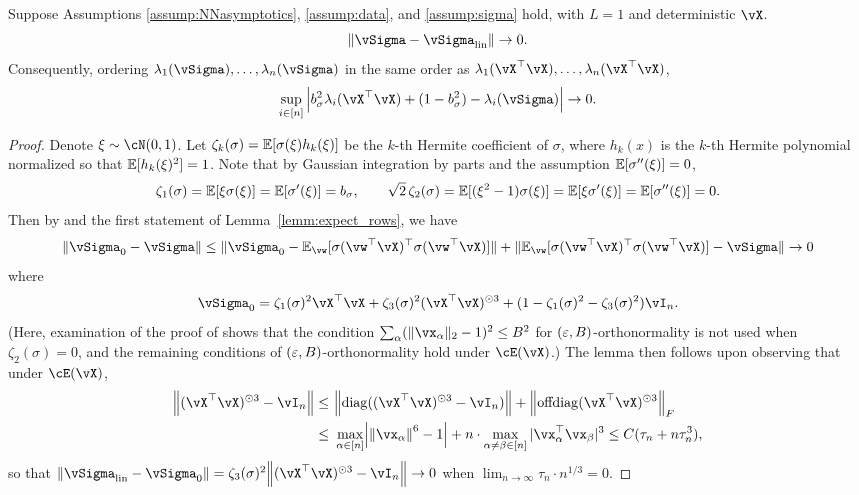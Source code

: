 \begin{lemma}\label{lemm:phi_0}
Suppose Assumptions \ref{assump:NNasymptotics}, \ref{assump:data}, and
\ref{assump:sigma} hold, with $L=1$ and deterministic $\vX$.
\[\|\vSigma-\vSigma_{\mathrm{lin}}\| \to 0.\] 
Consequently, ordering $\lambda_1(\vSigma),\ldots,\lambda_n(\vSigma)$
in the same order as
$\lambda_1(\vX^\top\vX),\ldots,\lambda_n(\vX^\top\vX)$,
\begin{equation}\label{eq:lambda_i_diff}
	\sup_{i \in [n]} \Big|b_\sigma^2\lambda_i(\vX^\top \vX)
+(1-b_\sigma^2)-\lambda_i(\vSigma)\Big| \to 0.
\end{equation}
\end{lemma}
\begin{proof}
Denote $\xi \sim \cN(0,1)$. Let $\zeta_k(\sigma)=\mathbb{E}[\sigma(\xi)h_k(\xi)]$ be
the $k$-th Hermite coefficient of $\sigma$, where $h_k(x)$ is the $k$-th
Hermite polynomial normalized so that $\mathbb{E}[h_k(\xi)^2]=1$. Note that by Gaussian
integration by parts and the assumption $\mathbb{E}[\sigma''(\xi)]=0$,
\[\zeta_1(\sigma)=\mathbb{E}[\xi \sigma(\xi)]
=\mathbb{E}[\sigma'(\xi)]=b_\sigma,
\qquad \sqrt{2}\,\zeta_2(\sigma)=\mathbb{E}[(\xi^2-1)\sigma(\xi)]
=\mathbb{E}[\xi\sigma'(\xi)]=\mathbb{E}[\sigma''(\xi)]=0.\]
Then by \cite[Lemma 5.2]{wang2021deformed} and the first statement
of Lemma~\ref{lemm:expect_rows}, we have
\[\|\vSigma_0-\vSigma\|
\leq \|\vSigma_0-\E_{\vw}[\sigma(\vw^\top \vX)^\top \sigma(\vw^\top \vX)]\|
+\|\E_{\vw}[\sigma(\vw^\top \vX)^\top \sigma(\vw^\top \vX)]-\vSigma\| \to
0\]
where
	\[{\vSigma}_0=\zeta_1(\sigma)^2 \vX^\top \vX+  \zeta_3(\sigma)^2(
\vX^\top  \vX)^{\odot 3}+(1-\zeta_1(\sigma)^2-\zeta_3(\sigma)^2)\vI_n.\]
(Here, examination of the proof of \cite[Lemma 5.2]{wang2021deformed} shows
that the condition $\sum_\alpha (\|\vx_\alpha\|_2-1)^2 \leq B^2$ for
$(\varepsilon,B)$-orthonormality is not
used when $\zeta_2(\sigma)=0$, and the remaining conditions of
$(\varepsilon,B)$-orthonormality hold under $\cE(\vX)$.)
The lemma then follows upon observing that under $\cE(\vX)$,
\begin{align*}
	\norm{( \vX^\top  \vX)^{\odot 3}-\vI_n}\le~& \norm{\diag(( \vX^\top  \vX)^{\odot 3}-\vI_n)} +\norm{\offdiag(\vX^\top  \vX)^{\odot 3}}_F\\
	\le ~& \max_{\alpha\in [n]} \left|\norm{
\vx_\alpha}^6-1\right|+n\cdot\max_{\alpha\neq\beta\in[n]}|\vx_\alpha^\top\vx_\beta|^3
\leq C(\tau_n+n\tau_n^3),
\end{align*}
so that $\norm{\vSigma_{\mathrm{lin}}-\vSigma_0}=\zeta_3(\sigma)^2
\norm{( \vX^\top  \vX)^{\odot 3}-\vI_n} \to 0$ when $\lim_{n \to \infty} \tau_n
\cdot n^{1/3}=0$.
\end{proof}

